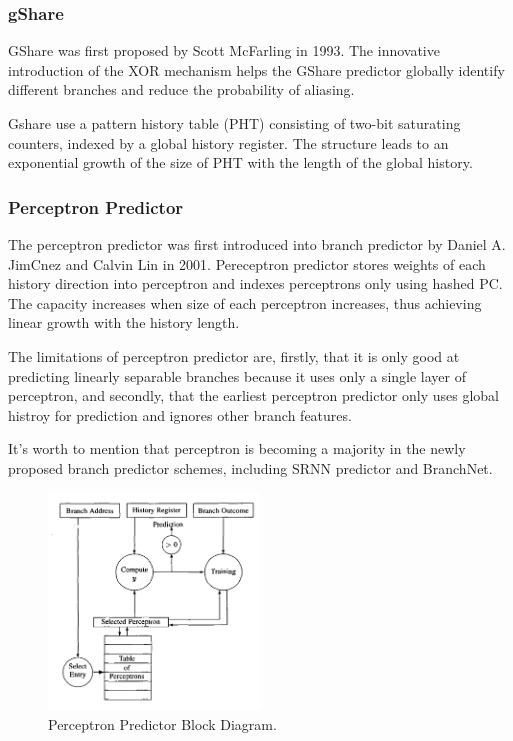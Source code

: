\subsubsection{gShare}
GShare was first proposed by Scott McFarling in 1993. The innovative introduction of the XOR mechanism helps the GShare predictor globally identify different branches and reduce the probability of aliasing. 
\par\hspace*{\fill}\par
Gshare use a pattern history table (PHT) consisting of two-bit saturating counters, indexed by a global history register. The structure leads to an exponential growth of the size of PHT with the length of the global history\cite{jimenez_dynamic_2001}.

\subsubsection{Perceptron Predictor}
The perceptron predictor was first introduced into branch predictor by Daniel A. JimCnez and Calvin Lin in 2001. Pereceptron predictor stores weights of each history direction into perceptron and indexes perceptrons only using hashed PC. The capacity increases when size of each perceptron increases, thus achieving linear growth with the history length. 
\par\hspace*{\fill}\par
The limitations of perceptron predictor are, firstly, that it is only good at predicting linearly separable branches because it uses only a single layer of perceptron, and secondly, that the earliest perceptron predictor only uses global histroy for prediction and ignores other branch features.
\par\hspace*{\fill}\par
It's worth to mention that perceptron is becoming a majority in the newly proposed branch predictor schemes, including SRNN predictor\cite{zhang_dynamic_2020} and BranchNet\cite{zangeneh_branchnet_2020}. 

\begin{figure}[htbp!] 
\centering    
\includegraphics[width=0.5\textwidth]{Chapter1/Figs/perceptron.png}
\caption{\centering Perceptron Predictor Block Diagram\cite{jimenez_dynamic_2001}. }
\label{fig:perceptron2001}
\end{figure} %

